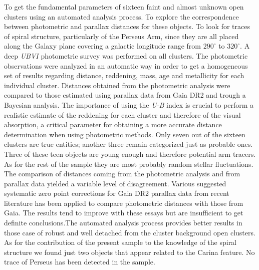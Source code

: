 \documentclass[draft]{aa}
\begin{document}
\abstract
{}
{To get the fundamental parameters of sixteen faint and almost unknown open
clusters using an automated analysis process. To explore the correspondence
between photometric and parallax distances for these objects. To look for
traces of spiral structure, particularly of the Perseus Arm, since they are
all placed along the Galaxy plane covering a galactic longitude range
from $290^\circ$ to $320^\circ$. }
{A deep \textit{UBVI} photometric survey was performed on all clusters. The
photometric observations were analyzed in an automatic way in order to get a
homogeneous set of results regarding distance, reddening, mass, age and
metallicity for each individual cluster. Distances obtained from the
photometric analysis were compared to those estimated using parallax data from
Gaia DR2 and trough a Bayesian
analysis. The importance of using the \textit{U-B} index is crucial to perform
a realistic estimate of the
reddening for each cluster and therefore of the visual absorption, a
critical parameter for obtaining a more accurate distance determination when
using photometric methods.}
{Only seven out of the sixteen clusters are true entities; another three
remain categorized just as probable ones. Three of these teen objects are
young enough and therefore potential arm tracers. As for the rest of the
sample they are most probably random stellar fluctuations. The comparison of
distances coming from the photometric analysis and from parallax data yielded
a variable level of disagreement. 
%
%
}
%
{Various suggested systematic zero point corrections for Gaia
DR2 parallax data from recent literature has been applied to compare
photometric distances with those from Gaia. The results tend to improve with
these essays but are insufficient to get definite conclusions.The automated
analysis process provides better results in those case of robust and well
detached from the cluster background open clusters. 
As for the contribution of the present sample to the knowledge of the spiral
structure we found just two objects that appear related to the
Carina feature. No trace of Perseus has been detected in the sample.}
\end{document}
